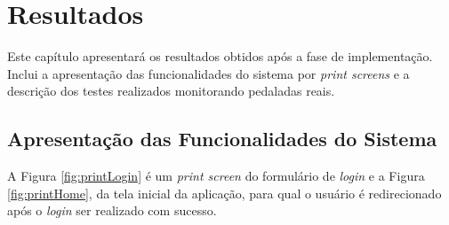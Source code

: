 \chapter{Resultados}  \label{cap:resultados}
Este capítulo apresentará os resultados obtidos após a fase de implementação. Inclui a apresentação das funcionalidades do sistema por \textit{print screens} e a descrição dos testes realizados monitorando pedaladas reais.

\section{Apresentação das Funcionalidades do Sistema}
A Figura \ref{fig:printLogin} é um \textit{print screen} do formulário de \textit{login} e a Figura \ref{fig:printHome}, da tela inicial da aplicação, para qual o usuário é redirecionado após o \textit{login} ser realizado com sucesso.

